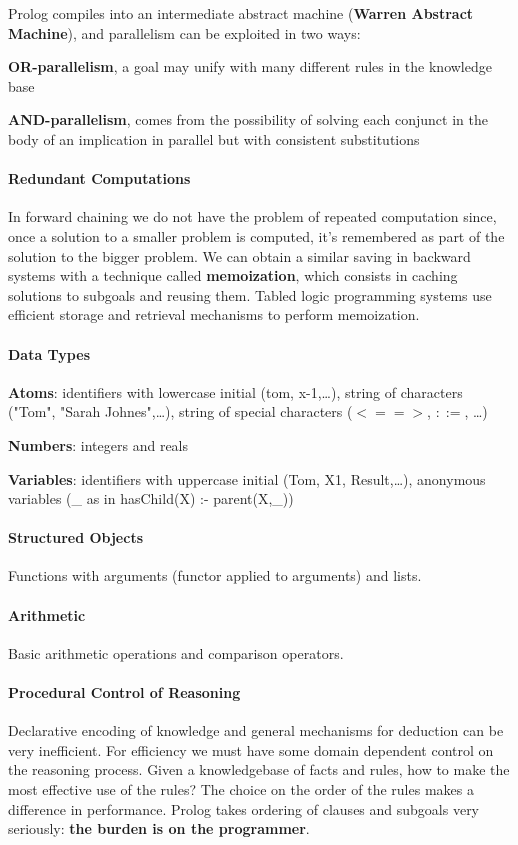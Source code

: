 \documentclass[10pt]{report}
\begin{document}
Prolog compiles into an intermediate abstract machine (\textbf{Warren Abstract Machine}), and parallelism can be exploited in two ways:
\begin{list}{}{}
	\item \textbf{OR-parallelism}, a goal may unify with many different rules in the knowledge base
	\item \textbf{AND-parallelism}, comes from the possibility of solving each conjunct in the body of an implication in parallel but with consistent substitutions
\end{list}
\paragraph{Redundant Computations} In forward chaining we do not have the problem of repeated computation since, once a solution to a smaller problem is computed, it's remembered as part of the solution to the bigger problem. We can obtain a similar saving in backward systems with a technique called \textbf{memoization}, which consists in caching solutions to subgoals and reusing them. Tabled logic programming systems use efficient storage and retrieval mechanisms to perform memoization.
\paragraph{Data Types}\begin{list}{}{}
	\item \textbf{Atoms}: identifiers with lowercase initial (tom, x-1,\ldots), string of characters ("Tom", "Sarah Johnes",\ldots), string of special characters ($<==>$, $::=$, \ldots)
	\item \textbf{Numbers}: integers and reals
	\item \textbf{Variables}: identifiers with uppercase initial (Tom, X1, Result,\ldots), anonymous variables (\_ as in hasChild(X) :- parent(X,\_))
\end{list}
\paragraph{Structured Objects} Functions with arguments (functor applied to arguments) and lists.
\paragraph{Arithmetic} Basic arithmetic operations and comparison operators.
\paragraph{Procedural Control of Reasoning} Declarative encoding of knowledge and general mechanisms for deduction can be very inefficient. For efficiency we must have some domain dependent control on the reasoning process. Given a knowledgebase of facts and rules, how to make the most effective use of the rules? The choice on the order of the rules makes a difference in performance. Prolog takes ordering of clauses and subgoals very seriously: \textbf{the burden is on the programmer}.
\end{document}
